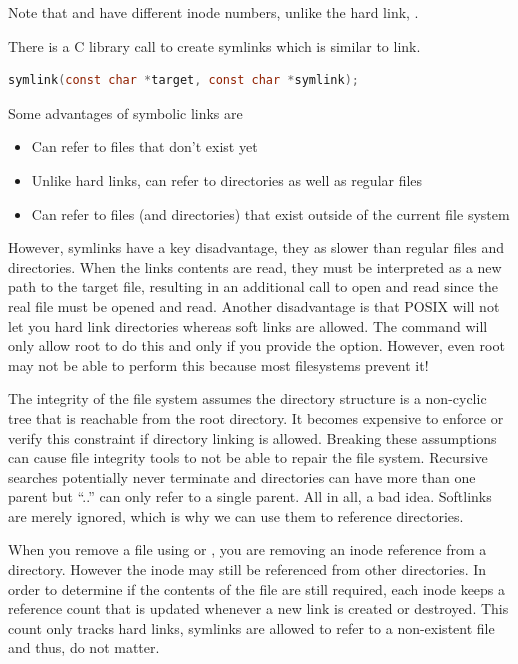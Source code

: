 Note that  and  have different inode numbers, unlike the hard link, .

There is a C library call to create symlinks which is similar to link.

\begin{lstlisting}[language=C]
symlink(const char *target, const char *symlink);
\end{lstlisting}

Some advantages of symbolic links are

\begin{itemize}
\tightlist
\item
  Can refer to files that don't exist yet
\item
  Unlike hard links, can refer to directories as well as regular files
\item
  Can refer to files (and directories) that exist outside of the current file system
\end{itemize}

However, symlinks have a key disadvantage, they as slower than regular files and directories.
When the links contents are read, they must be interpreted as a new path to the target file, resulting in an additional call to open and read since the real file must be opened and read.
Another disadvantage is that POSIX will not let you hard link directories whereas soft links are allowed.
The  command will only allow root to do this and only if you provide the  option.
However, even root may not be able to perform this because most filesystems prevent it!

The integrity of the file system assumes the directory structure  is a non-cyclic tree that is reachable from the root directory.
It becomes expensive to enforce or verify this constraint if directory linking is allowed.
Breaking these assumptions can cause file integrity tools to not be able to repair the file system.
Recursive searches potentially never terminate and directories can have more than one parent but ``..'' can only refer to a single parent.
All in all, a bad idea.
Softlinks are merely ignored, which is why we can use them to reference directories.

When you remove a file using  or , you are removing an inode reference from a directory.
However the inode may still be referenced from other directories.
In order to determine if the contents of the file are still required, each inode keeps a reference count that is updated whenever a new link is created or destroyed.
This count only tracks hard links, symlinks are allowed to refer to a non-existent file and thus, do not matter.


